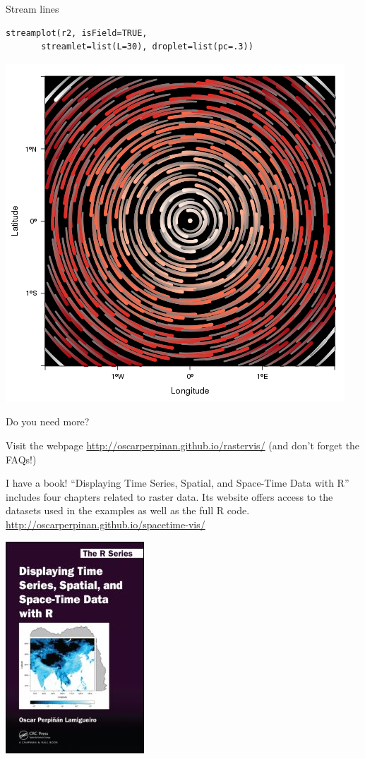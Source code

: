 \documentclass[xcolor={usenames,svgnames,dvipsnames}]{beamer}
\begin{document}
\begin{frame}[fragile,label=sec-19]{Stream lines}
 \lstset{language=R,numbers=none}
\begin{lstlisting}
streamplot(r2, isField=TRUE,
	   streamlet=list(L=30), droplet=list(pc=.3))
\end{lstlisting}

\begin{center}
\includegraphics[height=0.65\textheight]{figs/streamplotReds.png}
\end{center}
\end{frame}

\begin{frame}[label=sec-20]{Do you need more?}
\begin{block}{Visit the webpage}
\url{http://oscarperpinan.github.io/rastervis/} (and don't forget the FAQs!)
\end{block}
\begin{block}{I have a book!}
\alert{“Displaying Time Series, Spatial, and Space-Time Data with R”} includes four chapters related to raster data.
Its website offers access to the datasets used in the examples as well as the full R code.
\url{http://oscarperpinan.github.io/spacetime-vis/}

\begin{center}
\includegraphics[height=0.3\textwidth]{figs/book.jpg}
\end{center}
\end{block}
\end{frame}
\end{document}
